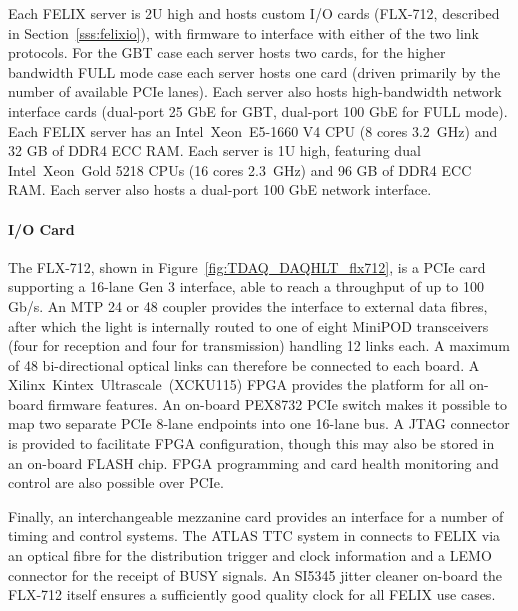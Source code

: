 \documentclass[cernpreprint, atlasdraft=false, UKenglish,british,orcidlogo, texmf, orcidlogo]{atlasdoc}
\begin{document}
Each \gls{FELIX} server is 2U high and hosts custom \gls{I/O} cards (FLX-712, described in Section~\ref{sss:felixio}), with firmware to interface with either of the two link protocols. For the \gls{GBT} case each server hosts two cards, for the higher bandwidth FULL mode case each server hosts one card (driven primarily by the number of available \gls{PCIe} lanes). Each server also hosts high-bandwidth network interface cards (dual-port 25 \gls{GbE} for \gls{GBT}, dual-port 100 \gls{GbE} for FULL mode). Each \gls{FELIX} server has an Intel\textregistered~Xeon\textregistered~E5-1660 V4 CPU (8 cores \@ \SI{3.2}{\GHz}) and 32 GB of \gls{DDR}4 \gls{ECC} \gls{RAM}. Each \swrod server is 1U high, featuring dual Intel\textregistered~Xeon\textregistered~Gold 5218 CPUs (16 cores \@ \SI{2.3}{\GHz}) and 96 GB of \gls{DDR}4 \gls{ECC} \gls{RAM}. Each server also hosts a dual-port 100 \gls{GbE} network interface.
 
\paragraph{ I/O Card \label{sss:felixio}}
 
The FLX-712, shown in Figure~\ref{fig:TDAQ_DAQHLT_flx712}, is a \gls{PCIe}  card supporting a 16-lane Gen 3 interface, able to reach a throughput of up to 100 Gb/s. An \gls{MTP} 24 or 48 coupler provides the interface to external data fibres, after which the light is internally routed to one of eight MiniPOD transceivers (four for reception and four for transmission) handling 12 links each. A maximum of 48 bi-directional optical links can therefore be connected to each board. A Xilinx\textregistered~Kintex\textregistered~Ultrascale\texttrademark~(XCKU115) \gls{FPGA} provides the platform for all on-board firmware features. An on-board PEX8732 \gls{PCIe}  switch makes it possible to map two separate \gls{PCIe}  8-lane endpoints into one 16-lane bus. A \gls{JTAG} connector is provided to facilitate \gls{FPGA} configuration, though this may also be stored in an on-board FLASH chip. \gls{FPGA} programming and card health monitoring and control are also possible over \gls{PCIe}.
 
Finally, an interchangeable mezzanine card provides an interface for a number of timing and control systems. The ATLAS \gls{TTC} system in \RunThr connects to \gls{FELIX} via an optical fibre for the distribution trigger and clock information and a LEMO connector for the receipt of BUSY signals. An SI5345 jitter cleaner on-board the FLX-712 itself ensures a sufficiently good quality clock for all \gls{FELIX} use cases.
 
\end{document}
